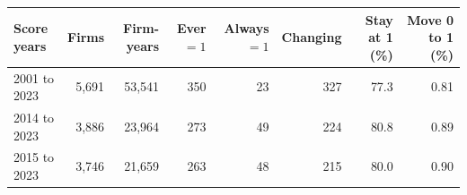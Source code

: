 \begin{tabular}{lrrrrrrr}
\toprule
Score years & Firms & Firm-years & Ever $=1$ & Always $=1$ & Changing & Stay at 1 (\%) & Move 0 to 1 (\%) \\
\midrule
2001 to 2023 & 5,691 & 53,541 & 350 & 23 & 327 & 77.3 & 0.81 \\
2014 to 2023 & 3,886 & 23,964 & 273 & 49 & 224 & 80.8 & 0.89 \\
2015 to 2023 & 3,746 & 21,659 & 263 & 48 & 215 & 80.0 & 0.90 \\
\bottomrule
\end{tabular}
